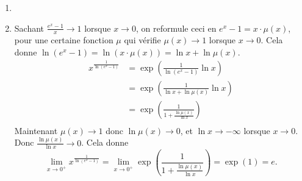 {{\begin{enumerate}
\begin{align*}
  &= \exp \left( -1 + \frac{\ln \mu(e^{-x})}{x}  \right) \\
\end{align*}
$\mu(e^{-x}) \to 1$ donc $\ln\mu(e^{-x}) \to 0$, donc $\frac{\ln \mu(e^{-x})}{x} \to 0$ lorsque $x \to +\infty$.
Bilan : la limite est $\exp(-1)=\frac 1 e$.
 \item
 \item Sachant $\frac{e^x - 1}{x} \to 1$ lorsque $x\to 0$, on reformule ceci
en $e^x-1 = x \cdot \mu(x)$, pour une certaine fonction $\mu$ qui vérifie $\mu(x) \to 1$ lorsque $x\to 0$.
Cela donne $\ln (e^x-1) = \ln (x \cdot \mu(x)) = \ln x + \ln \mu(x).$
\begin{align*}
 x^{\frac{1}{\ln (e^{x}-1)}} 
  &= \exp\left( \frac{1}{\ln (e^{x}-1)} \ln x  \right) \\
  &= \exp\left( \frac{1}{\ln x + \ln \mu(x)} \ln x  \right) \\
  &= \exp\left( \frac{1}{1 + \frac{\ln \mu(x)}{\ln x}} \right) \\
\end{align*}
Maintenant $\mu(x) \to 1$ donc $\ln \mu(x) \to 0$, et $\ln x \to - \infty$ lorsque $x \to 0$.
Donc $\frac{\ln \mu(x)}{\ln x} \to 0$.
Cela donne 
$$\lim\limits_{x\rightarrow 0^{+}}x^{\frac{1}{\ln (e^{x}-1)}} = \lim\limits_{x\rightarrow 0^{+}} \exp\left( \frac{1}{1 + \frac{\ln \mu(x)}{\ln x}} \right) = \exp\left(1\right) = e.$$
\end{enumerate}
}
}
